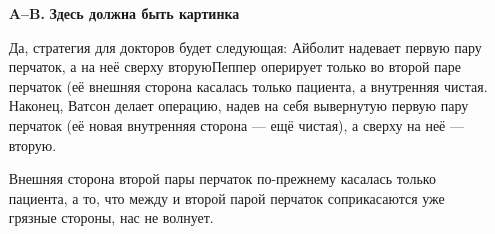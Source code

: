 \begin{itemize}

\item[\bfseries A–B.] {\bfseries Здесь должна быть картинка}

\itC Да, стратегия для докторов будет следующая: Айболит надевает первую пару перчаток, а на неё сверху вторую\scolon Пеппер оперирует только во второй паре перчаток (её внешняя сторона касалась только пациента, а внутренняя чистая. Наконец, Ватсон делает операцию, надев на себя вывернутую первую пару перчаток (её новая внутренняя сторона — ещё чистая), а сверху на неё — вторую.

Внешняя сторона второй пары перчаток по-прежнему касалась только пациента, а то, что между и второй парой перчаток соприкасаются уже грязные стороны, нас не волнует.
\end{itemize}